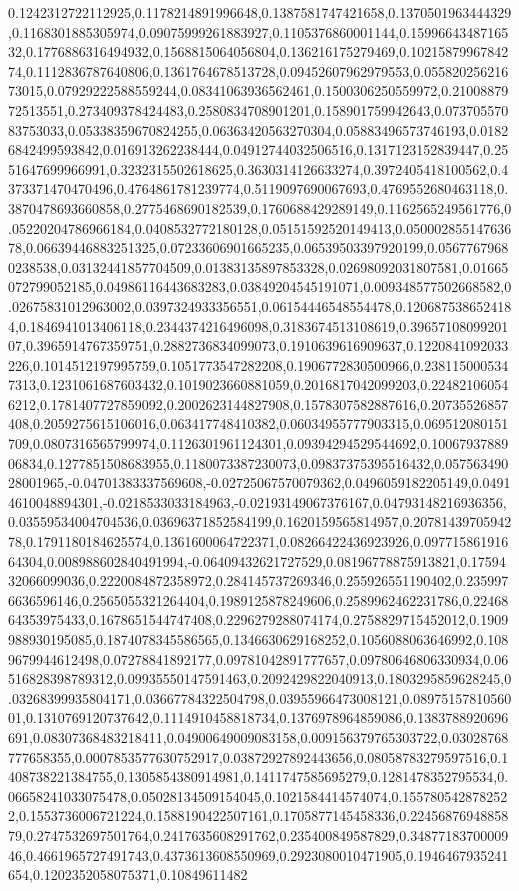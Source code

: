 0.1242312722112925,0.1178214891996648,0.1387581747421658,0.1370501963444329,0.1168301885305974,0.09075999261883927,0.1105376860001144,0.1599664348716532,0.1776886316494932,0.1568815064056804,0.136216175279469,0.1021587996784274,0.1112836787640806,0.1361764678513728,0.09452607962979553,0.05582025621673015,0.07929222588559244,0.08341063936562461,0.1500306250559972,0.2100887972513551,0.273409378424483,0.2580834708901201,0.158901759942643,0.07370557083753033,0.05338359670824255,0.06363420563270304,0.05883496573746193,0.01826842499593842,0.016913262238444,0.04912744032506516,0.1317123152839447,0.2551647699966991,0.3232315502618625,0.3630314126633274,0.3972405418100562,0.4373371470470496,0.4764861781239774,0.5119097690067693,0.4769552680463118,0.3870478693660858,0.2775468690182539,0.1760688429289149,0.1162565249561776,0.05220204786966184,0.0408532772180128,0.05151592520149413,0.05000285514763678,0.06639446883251325,0.07233606901665235,0.06539503397920199,0.05677679680238538,0.03132441857704509,0.01383135897853328,0.02698092031807581,0.01665072799052185,0.04986116443683283,0.03849204545191071,0.009348577502668582,0.02675831012963002,0.0397324933356551,0.06154446548554478,0.1206875386524184,0.1846941013406118,0.2344374216496098,0.3183674513108619,0.3965710809920107,0.3965914767359751,0.2882736834099073,0.1910639616909637,0.1220841092033226,0.1014512197995759,0.1051773547282208,0.1906772830500966,0.2381150005347313,0.1231061687603432,0.1019023660881059,0.2016817042099203,0.224821060546212,0.1781407727859092,0.2002623144827908,0.1578307582887616,0.20735526857408,0.2059275615106016,0.063417748410382,0.06034955777903315,0.069512080151709,0.0807316565799974,0.1126301961124301,0.09394294529544692,0.1006793788906834,0.1277851508683955,0.1180073387230073,0.09837375395516432,0.05756349028001965,-0.04701383337569608,-0.02725067570079362,0.0496059182205149,0.04914610048894301,-0.0218533033184963,-0.02193149067376167,0.04793148216936356,0.03559534004704536,0.03696371852584199,0.1620159565814957,0.2078143970594278,0.1791180184625574,0.1361600064722371,0.08266422436923926,0.09771586191664304,0.008988602840491994,-0.06409432621727529,0.08196778875913821,0.1759432066099036,0.2220084872358972,0.284145737269346,0.255926551190402,0.2359976636596146,0.2565055321264404,0.1989125878249606,0.2589962462231786,0.2246864353975433,0.1678651544747408,0.2296279288074174,0.2758829715452012,0.1909988930195085,0.1874078345586565,0.1346630629168252,0.1056088063646992,0.1089679944612498,0.07278841892177,0.09781042891777657,0.09780646806330934,0.06516828398789312,0.09935550147591463,0.2092429822040913,0.1803295859628245,0.03268399935804171,0.03667784322504798,0.03955966473008121,0.0897515781056001,0.1310769120737642,0.1114910458818734,0.1376978964859086,0.1383788920696691,0.08307368483218411,0.04900649009083158,0.009156379765303722,0.03028768777658355,0.0007853577630752917,0.03872927892443656,0.08058783279597516,0.1408738221384755,0.1305854380914981,0.1411747585695279,0.1281478352795534,0.06658241033075478,0.05028134509154045,0.1021584414574074,0.1557805428782522,0.1553736006721224,0.1588190422507161,0.1705877145458336,0.2245687694885879,0.2747532697501764,0.2417635608291762,0.235400849587829,0.3487718370000946,0.4661965727491743,0.4373613608550969,0.2923080010471905,0.1946467935241654,0.1202352058075371,0.10849611482